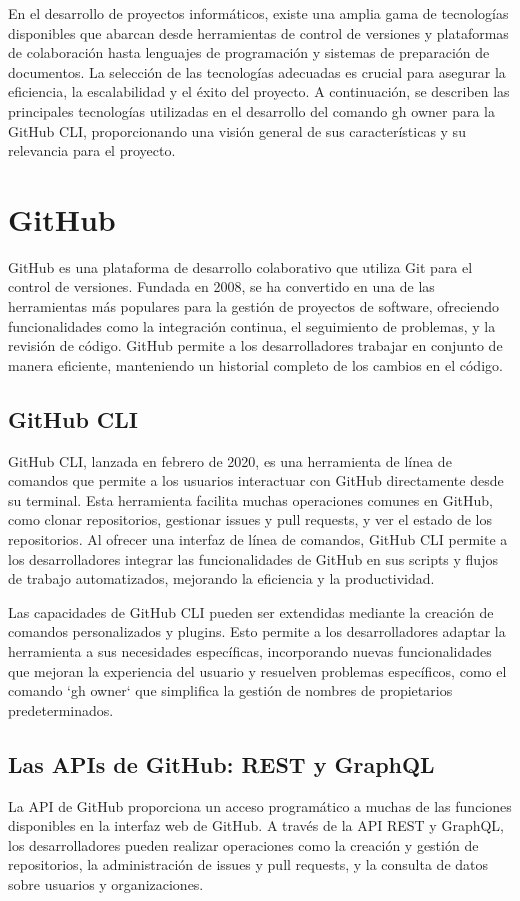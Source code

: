 En el desarrollo de proyectos informáticos, existe una amplia gama de tecnologías disponibles que abarcan desde herramientas de control de versiones y plataformas de colaboración hasta lenguajes de programación y sistemas de preparación de documentos. La selección de las tecnologías adecuadas es crucial para asegurar la eficiencia, la escalabilidad y el éxito del proyecto. A continuación, se describen las principales tecnologías utilizadas en el desarrollo del comando gh owner para la GitHub CLI, proporcionando una visión general de sus características y su relevancia para el proyecto.

\section{GitHub}
GitHub es una plataforma de desarrollo colaborativo que utiliza Git para el control de versiones. Fundada en 2008, se ha convertido en una de las herramientas más populares para la gestión de proyectos de software, ofreciendo funcionalidades como la integración continua, el seguimiento de problemas, y la revisión de código. GitHub permite a los desarrolladores trabajar en conjunto de manera eficiente, manteniendo un historial completo de los cambios en el código.

\subsection{GitHub CLI} 
GitHub CLI, lanzada en febrero de 2020, es una herramienta de línea de comandos que permite a los usuarios interactuar con GitHub directamente desde su terminal. Esta herramienta facilita muchas operaciones comunes en GitHub, como clonar repositorios, gestionar issues y pull requests, y ver el estado de los repositorios. Al ofrecer una interfaz de línea de comandos, GitHub CLI permite a los desarrolladores integrar las funcionalidades de GitHub en sus scripts y flujos de trabajo automatizados, mejorando la eficiencia y la productividad.

Las capacidades de GitHub CLI pueden ser extendidas mediante la creación de comandos personalizados y plugins. Esto permite a los desarrolladores adaptar la herramienta a sus necesidades específicas, incorporando nuevas funcionalidades que mejoran la experiencia del usuario y resuelven problemas específicos, como el comando `gh owner` que simplifica la gestión de nombres de propietarios predeterminados.

\subsection{Las APIs de GitHub: REST y  GraphQL}
La API de GitHub proporciona un acceso programático a muchas de las funciones disponibles en la interfaz web de GitHub. A través de la API REST y GraphQL, los desarrolladores pueden realizar operaciones como la creación y gestión de repositorios, la administración de issues y pull requests, y la consulta de datos sobre usuarios y organizaciones.

